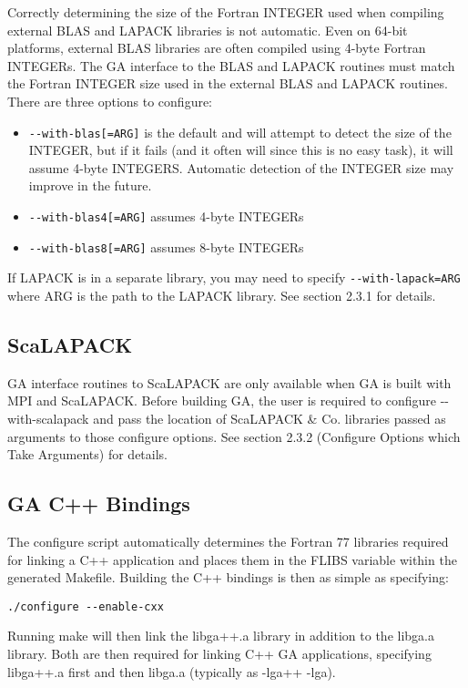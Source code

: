 Correctly determining the size of the Fortran INTEGER used when compiling
external BLAS and LAPACK libraries is not automatic. Even on 64-bit platforms,
external BLAS libraries are often compiled using 4-byte Fortran INTEGERs. The
GA interface to the BLAS and LAPACK routines must match the Fortran INTEGER
size used in the external BLAS and LAPACK routines. There are three options to
configure: 
\begin{itemize}
\item \texttt{-{}-with-blas{[}=ARG{]}} is the default and will attempt to
detect the size of the INTEGER, but if it fails (and it often will since this
is no easy task), it will assume 4-byte INTEGERS. Automatic detection of the
INTEGER size may improve in the future.
\item \texttt{-{}-with-blas4{[}=ARG{]}} assumes 4-byte INTEGERs 
\item \texttt{-{}-with-blas8{[}=ARG{]}} assumes 8-byte INTEGERs 
\end{itemize}
If LAPACK is in a separate library, you may need to specify
\texttt{-{}-with-lapack=ARG} where ARG is the path to the LAPACK library. See
section 2.3.1 for details. 

\subsection{ScaLAPACK}

GA interface routines to ScaLAPACK are only available when GA is built with MPI
and ScaLAPACK. Before building GA, the user is required to configure
-{}-with-scalapack and pass the location of ScaLAPACK \& Co. libraries passed
as arguments to those configure options. See section 2.3.2 (Configure Options
which Take Arguments) for details. 

\subsection{GA C++ Bindings}

The configure script automatically determines the Fortran 77 libraries required
for linking a C++ application and places them in the FLIBS variable within the
generated Makefile. Building the C++ bindings is then as simple as specifying: 
\begin{verbatim}
./configure --enable-cxx
\end{verbatim}
Running make will then link the libga++.a library in addition to the libga.a
library. Both are then required for linking C++ GA applications, specifying
libga++.a first and then libga.a (typically as -lga++ -lga). 

